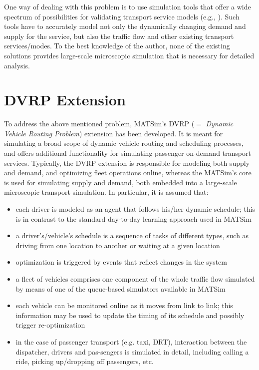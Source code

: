 One way of dealing with this problem is to use simulation tools that offer a wide spectrum of possibilities for validating transport service models (e.g., \cite{ReganMahmassaniJaillet1998DynamicFleetManagementSimulation, BarceloEtc2007RoutingSchedulingSimulationLogistics, LiaoEtc2008ObjOrFramework4DVRP} ).
%
Such tools have to accurately model not only the dynamically changing demand and supply for the service, but also the traffic flow and other existing transport services/modes. To the best knowledge of the author, none of the existing solutions provides large-scale microscopic simulation that is necessary for detailed analysis. 



\section{DVRP Extension}

To address the above mentioned problem, MATSim's DVRP ($=$ \emph{Dynamic Vehicle Routing Problem}) extension has been developed. It is meant for simulating a broad scope of dynamic vehicle routing and scheduling processes, and offers additional functionality for simulating passenger on-demand transport services. Typically, the DVRP extension is responsible for modeling both supply and demand, and optimizing fleet operations online, whereas the MATSim's core is used for simulating supply and demand, both embedded into a large-scale microscopic transport simulation. In particular, it is assumed that:
%
\begin{itemize}
	\item each driver is modeled as an agent that follows his/her dynamic schedule; this is in contrast to the standard day-to-day learning approach used in MATSim

	\item a driver’s/vehicle’s schedule is a sequence of tasks of different types, such as driving from one location to another or waiting at a given location

	\item optimization is triggered by events that reflect changes in the system

	\item a fleet of vehicles comprises one component of the whole traffic flow simulated by means of one of the queue-based simulators available in MATSim

	\item each vehicle can be monitored online as it moves from link to link; this information may be used to update the timing of its schedule and possibly trigger re-optimization

	\item in the case of passenger transport (e.g. taxi, DRT), interaction between the dispatcher, drivers and pas-sengers is simulated in detail, including calling a ride, picking up/dropping off passengers, etc.
\end{itemize}


